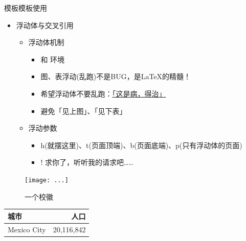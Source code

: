 \documentclass[fontset = adobe, xcolor=svgnames, t, aspectratio=169]{ctexbeamer}
\begin{document}
\begin{frame}[fragile]{\nwafuthesis 模板}{模板使用}
  \begin{itemize}
  \item 浮动体与交叉引用
    \begin{itemize}
    \item 浮动体机制
      \begin{itemize}
      \item {} 和  环境
      \item 图、表浮动(乱跑)不是BUG，是\LaTeX 的精髓！
      \item 希望浮动体不要乱跑：\href{https://liam.page/2017/03/11/floats-in-LaTeX-basic}{\alert{「这是病，得治」}}
      \item 避免「见上图」、「见下表」
      \end{itemize}
    \item 浮动参数
      \begin{itemize}
      \item h(就摆这里)、t(页面顶端)、b(页面底端)、p(只有浮动体的页面)
      \item ! 求你了，听听我的请求吧……
      \end{itemize}
    \end{itemize}
  \end{itemize}
  \begin{center}
  \begin{minipage}[h]{0.35\linewidth}
    \begin{texcode}
      \begin{figure}[htb!]
        \texttt{[image: ...]}
        \caption{一个校徽}
        \label{fig:logo}
      \end{figure}
    \end{texcode}
  \end{minipage}\quad
  \begin{minipage}[h]{0.53\linewidth}
    \begin{texcode}
      \begin{table}[htb]
        \begin{tabular}{lr}
          \toprule
          城市 & 人口 \\
          \midrule
          Mexico City & 20,116,842\\
          \bottomrule
        \end{tabular}
      \end{table}
    \end{texcode}
  \end{minipage}
  \end{center}
\end{frame}
\end{document}
